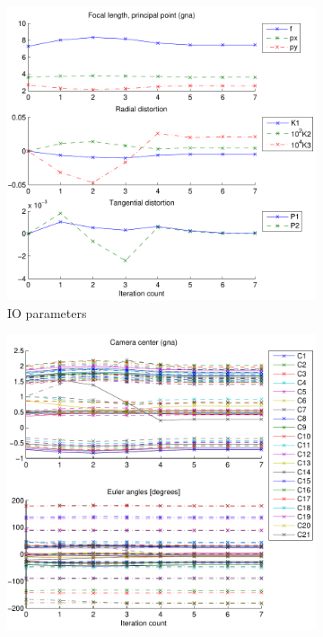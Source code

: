 \documentclass{article}
\begin{document}
\begin{figure}
  \centering
  \begin{subfigure}[b]{0.3\textwidth}
    \includegraphics[width=\textwidth]{ill/ccamiotrace}
    \caption{IO parameters}
    \label{fig:IOtrace}
  \end{subfigure}%
  \begin{subfigure}[b]{0.3\textwidth}
    \includegraphics[width=\textwidth]{ill/ccameotrace}

\end{subfigure}
\end{figure}
\end{document}
